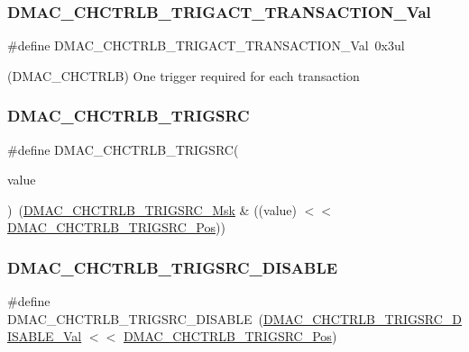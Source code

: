 \subsubsection{\texorpdfstring{DMAC\_CHCTRLB\_TRIGACT\_TRANSACTION\_Val}{DMAC\_CHCTRLB\_TRIGACT\_TRANSACTION\_Val}}
{\footnotesize\ttfamily \#define D\+M\+A\+C\+\_\+\+C\+H\+C\+T\+R\+L\+B\+\_\+\+T\+R\+I\+G\+A\+C\+T\+\_\+\+T\+R\+A\+N\+S\+A\+C\+T\+I\+O\+N\+\_\+\+Val~0x3ul}



(D\+M\+A\+C\+\_\+\+C\+H\+C\+T\+R\+LB) One trigger required for each transaction 

\mbox{\label{group___s_a_m_d21___d_m_a_c_gaa9c7962cdd8fc398c76183b2e777ee96}} 
\subsubsection{\texorpdfstring{DMAC\_CHCTRLB\_TRIGSRC}{DMAC\_CHCTRLB\_TRIGSRC}}
{\footnotesize\ttfamily \#define D\+M\+A\+C\+\_\+\+C\+H\+C\+T\+R\+L\+B\+\_\+\+T\+R\+I\+G\+S\+RC(\begin{DoxyParamCaption}\item[{}]{value }\end{DoxyParamCaption})~(\mbox{\hyperlink{group___s_a_m_d21___d_m_a_c_ga56d1c80c8387f39526a3330c62805c31}{D\+M\+A\+C\+\_\+\+C\+H\+C\+T\+R\+L\+B\+\_\+\+T\+R\+I\+G\+S\+R\+C\+\_\+\+Msk}} \& ((value) $<$$<$ \mbox{\hyperlink{group___s_a_m_d21___d_m_a_c_ga4716e5db96b3eb256a9f899457c3375c}{D\+M\+A\+C\+\_\+\+C\+H\+C\+T\+R\+L\+B\+\_\+\+T\+R\+I\+G\+S\+R\+C\+\_\+\+Pos}}))}

\mbox{\label{group___s_a_m_d21___d_m_a_c_gad260fac8687057a56b699d6387570e7f}} 
\subsubsection{\texorpdfstring{DMAC\_CHCTRLB\_TRIGSRC\_DISABLE}{DMAC\_CHCTRLB\_TRIGSRC\_DISABLE}}
{\footnotesize\ttfamily \#define D\+M\+A\+C\+\_\+\+C\+H\+C\+T\+R\+L\+B\+\_\+\+T\+R\+I\+G\+S\+R\+C\+\_\+\+D\+I\+S\+A\+B\+LE~(\mbox{\hyperlink{group___s_a_m_d21___d_m_a_c_ga855c3e6786f7b074a870d31d85888a87}{D\+M\+A\+C\+\_\+\+C\+H\+C\+T\+R\+L\+B\+\_\+\+T\+R\+I\+G\+S\+R\+C\+\_\+\+D\+I\+S\+A\+B\+L\+E\+\_\+\+Val}} $<$$<$ \mbox{\hyperlink{group___s_a_m_d21___d_m_a_c_ga4716e5db96b3eb256a9f899457c3375c}{D\+M\+A\+C\+\_\+\+C\+H\+C\+T\+R\+L\+B\+\_\+\+T\+R\+I\+G\+S\+R\+C\+\_\+\+Pos}})}

